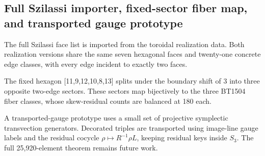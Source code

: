 \subsection{Full Szilassi importer, fixed-sector fiber map, and transported gauge prototype}
\label{sec:bt1520-bt1522-szilassi-sector-transport}

The full Szilassi face list is imported from the toroidal realization data.  Both realization versions share the same seven hexagonal faces and twenty-one concrete edge classes, with every edge incident to exactly two faces.

The fixed hexagon [11,9,12,10,8,13] splits under the boundary shift of 3 into three opposite two-edge sectors.  These sectors map bijectively to the three BT1504 fiber classes, whose skew-residual counts are balanced at 180 each.

A transported-gauge prototype uses a small set of projective symplectic transvection generators.  Decorated triples are transported using image-line gauge labels and the residual cocycle \(\rho\mapsto R^{-1}\rho L\), keeping residual keys inside \(S_3\).  The full 25,920-element theorem remains future work.
